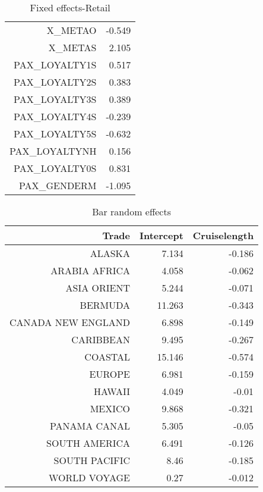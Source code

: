\documentclass{article}
\begin{document}
\begin{table}[H]
\begin{tabular}{rr}
	X\_METAO	                     &      -0.549            \\         
	X\_METAS	                     &      2.105             \\        
	PAX\_LOYALTY1S    	     &      0.517             \\        
	PAX\_LOYALTY2S    	     &       0.383            \\         
	PAX\_LOYALTY3S    	     &       0.389            \\         
	PAX\_LOYALTY4S    	     &       -0.239           \\          
	PAX\_LOYALTY5S    	     &       -0.632           \\          
	PAX\_LOYALTYNH    	     &        0.156           \\          
	PAX\_LOYALTY0S	             &        0.831           \\          
	PAX\_GENDERM	             &       -1.095           \\
	\hline 
	\hline   
\end{tabular}  
\caption{Fixed effects-Retail} 
\end{table}

\begin{table}[H]
	\centering
\begin{tabular}{rrr}
	Trade & Intercept  & Cruiselength \\ 
	\hline 
	\hline 
	ALASKA & 7.134 & -0.186 \\
	ARABIA AFRICA & 4.058 & -0.062 \\
	ASIA ORIENT & 5.244 & -0.071 \\
	BERMUDA & 11.263 & -0.343 \\
	CANADA NEW ENGLAND & 6.898 & -0.149 \\
	CARIBBEAN & 9.495 & -0.267 \\
	COASTAL & 15.146 & -0.574 \\
	EUROPE & 6.981 & -0.159 \\
	HAWAII & 4.049 & -0.01 \\
	MEXICO & 9.868 & -0.321 \\
	PANAMA CANAL & 5.305 & -0.05 \\
	SOUTH AMERICA & 6.491 & -0.126 \\
	SOUTH PACIFIC & 8.46 & -0.185 \\
	WORLD VOYAGE & 0.27 & -0.012 \\
	\hline 
	\hline 
\end{tabular}
\caption{Bar random effects}
\end{table}
\end{document}
